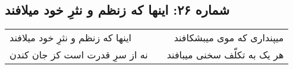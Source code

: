 \begin{center}
\section*{شماره ۲۶: اینها که زنظم و نثرِ خود میلافند}
\label{sec:026}
\begin{longtable}{l p{0.5cm} r}
اینها که زنظم و نثرِ خود میلافند
&&
میپنداری که موی میبشکافند
\\
نه از سرِ قدرت است کز جان کندن
&&
هر یک به تکلّف سخنی میبافند
\\
\end{longtable}
\end{center}

